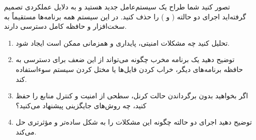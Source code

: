 \question[20]  تصور کنید شما طراح یک سیستم‌عامل جدید هستید و به دلایل عملکردی تصمیم گرفته‌اید اجرای دو حالته
    ( و )
    را حذف کنید. در این سیستم همه برنامه‌ها مستقیماً به سخت‌افزار و حافظه کامل دسترسی دارند.
    \begin{enumerate}
        \item تحلیل کنید چه مشکلات امنیتی، پایداری و همزمانی ممکن است ایجاد شود.
        \item توضیح دهید یک برنامه مخرب چگونه می‌تواند از این ضعف برای دسترسی به حافظه برنامه‌های دیگر، خراب کردن فایل‌ها یا مختل کردن سیستم سوءاستفاده کند.
        \item اگر بخواهید بدون برگرداندن حالت کرنل، سطحی از امنیت و کنترل منابع را حفظ کنید، چه روش‌های جایگزینی پیشنهاد می‌کنید؟
        \item توضیح دهید اجرای دو حالته چگونه این مشکلات را به شکل ساده‌تر و مؤثرتری حل می‌کند.
    \end{enumerate}